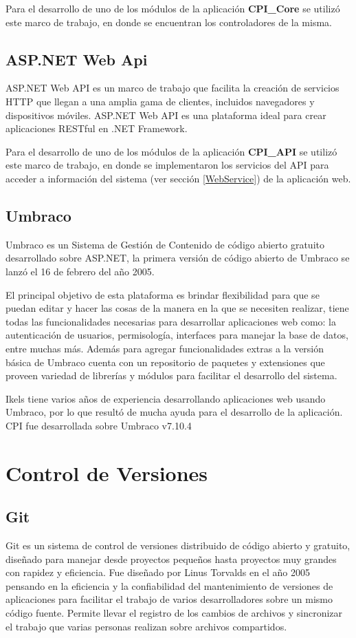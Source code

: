 Para el desarrollo de uno de los módulos de la aplicación \textbf{CPI\_Core} se utilizó este marco de trabajo, en donde se encuentran los controladores de la misma.

\subsection{ASP.NET Web Api}
ASP.NET Web API es un marco de trabajo que facilita la creación de servicios HTTP que llegan a una amplia gama de clientes, incluidos navegadores y dispositivos móviles. ASP.NET Web API es una plataforma ideal para crear aplicaciones RESTful en .NET Framework. \cite{aspWebAPIMicrosoft}

Para el desarrollo de uno de los módulos de la aplicación \textbf{CPI\_API} se utilizó este marco de trabajo, en donde se implementaron los servicios del API para acceder a información del sistema (ver sección \ref{WebService}) de la aplicación web.

\subsection{Umbraco}
Umbraco es un Sistema de Gestión de Contenido de código abierto gratuito desarrollado sobre ASP.NET, la primera versión de código abierto de Umbraco se lanzó el 16 de febrero del año 2005. \cite{umbraco}

El principal objetivo de esta plataforma es brindar flexibilidad para que se puedan editar y hacer las cosas de la manera en la que se necesiten realizar, tiene todas las funcionalidades necesarias para desarrollar aplicaciones web como: la autenticación de usuarios, permisología, interfaces para manejar la base de datos, entre muchas más. Además para agregar funcionalidades extras a la versión básica de Umbraco cuenta con un repositorio de paquetes y extensiones que proveen variedad de librerías y módulos para facilitar el desarrollo del sistema. 

Ikels tiene varios años de experiencia desarrollando aplicaciones web usando Umbraco, por lo que resultó de mucha ayuda para el desarrollo de la aplicación. CPI fue desarrollada sobre Umbraco v7.10.4


\section{Control de Versiones}
\subsection{Git}
Git es un sistema de control de versiones distribuido de código abierto y gratuito, diseñado para manejar desde proyectos pequeños hasta proyectos muy grandes con rapidez y eficiencia. \cite{git} Fue diseñado por Linus Torvalds en el año 2005 pensando en la eficiencia y la confiabilidad del mantenimiento de versiones de aplicaciones para facilitar el trabajo de varios desarrolladores sobre un mismo código fuente. Permite llevar el registro de los cambios de archivos y sincronizar el trabajo que varias personas realizan sobre archivos compartidos.

